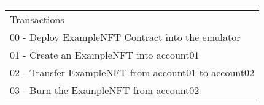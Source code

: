 \documentclass[../NFTComp_IEEE.tex]{subfiles}
\begin{document}
\begin{table}[]
{\begin{tabular}{ccccc}
            \multicolumn{1}{l}{}                               & \multicolumn{1}{l}{}                                                           & \multicolumn{1}{l}{}                         & \multicolumn{1}{l}{}                          & \multicolumn{1}{l}{}                \\ \hline
            \multicolumn{5}{|l|}{Transactions}                                                                                                                                                                                                                                       \\ \hline
            \multicolumn{5}{|l|}{00 - Deploy ExampleNFT Contract into the emulator}                                                                                                                                                                                                  \\ \hline
            \multicolumn{5}{|l|}{01 - Create an ExampleNFT into account01}                                                                                                                                                                                                           \\ \hline
            \multicolumn{5}{|l|}{02 - Transfer ExampleNFT from account01 to account02}                                                                                                                                                                                               \\ \hline
            \multicolumn{5}{|l|}{03 - Burn the ExampleNFT from account02}                                                                                                                                                                                                            \\ \hline
        \end{tabular}%
    }
\end{table}
\end{document}
